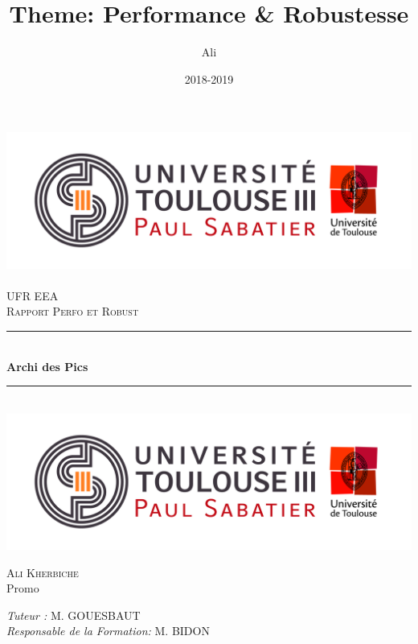\documentclass[12pt, a4paper, openany]{report}
\title{Theme: Performance & Robustesse}
\author{Ali \bsc{Kherbiche}}
\date{2018-2019}
\newcommand{\HRule}{\rule{\linewidth}{0.5mm}}
\begin{document}

\makeatletter
  \begin{titlepage}
  

  \begin{sffamily}
   \begin{center}

    \includegraphics[scale=0.5]{Logo_UT3.jpg}~\\[1.5cm]

    \textsc{\LARGE UFR EEA }\\[2cm]

    \textsc{\Large Rapport Perfo et Robust}\\[1.5cm]

    \HRule \\[0.4cm]
    { \huge \bfseries Archi des Pics\\[0.4cm] }

    \HRule \\[2cm]
    \includegraphics[scale=0.3]{Logo_UT3.jpg}
    \\[2cm]

    \begin{minipage}{0.4\textwidth}
      \begin{flushleft} \large
         \textsc{Ali Kherbiche}\\
        Promo \\
      \end{flushleft}
    \end{minipage}
    \begin{minipage}{0.4\textwidth}
      \begin{flushright} \large
        \emph{Tuteur :}  \textsc{M. GOUESBAUT}\\
        \emph{Responsable de la Formation:} \textsc{M. BIDON}
      \end{flushright}
    \end{minipage}


\end{center}
\end{sffamily}
\end{titlepage}
\end{document}
